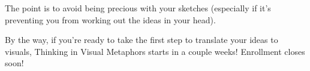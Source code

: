 \vspace{2mm}
\begin{center}
\begin{minipage}{0.92\textwidth}
\small
The point is to avoid being precious with your sketches (especially if it’s preventing you from working out the ideas in your head).

By the way, if you’re ready to take the first step to translate your ideas to visuals, Thinking in Visual Metaphors starts in a couple weeks! Enrollment closes soon!
\end{minipage}
\end{center}
\vspace*{\fill}